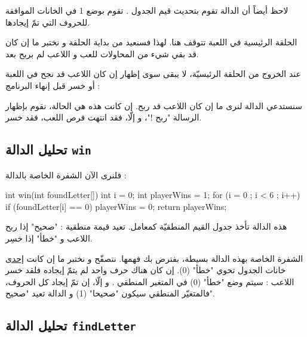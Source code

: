 \begin{information}
لاحظ أيضاً أن الدالة
تقوم بتحديث قيم الجدول
.
تقوم بوضع 1 في الخانات الموافقة للحروف التي تمّ إيجادها.
\end{information}

الحلقة الرئيسية في اللعبة تتوقف هنا. لهذا فسنعيد من بداية الحلقة و نختبر ما إن كان قد بقي شيء من المحاولات للعب و اللاعب لم بربح بعد.

عند الخروج من الحلقة الرئيسيّة، لا يبقى سوى إظهار إن كان اللاعب قد نجح في اللعبة أو خسر قبل إنهاء البرنامج :

\begin{Csource}
if (win(foundLetter))
	printf("\n\nYou win ! the secret word is : %
else
	printf("\n\nYou lose ! the secret word is : %
return 0;
}
\end{Csource}

سنستدعي الدالة
لنرى ما إن كان اللاعب قد ربح. إن كانت هذه هي الحالة، نقوم بإظهار الرسالة "ربح !"، و إلّا، فقد انتهت فرص اللعب، فقد خسر.

\subsection{تحليل الدالة \texttt{win}}

فلنرى الآن الشفرة الخاصة بالدالة
 :

\begin{Csource}
int win(int foundLetter[])
{
  int i = 0;
  int playerWins = 1;
  for (i = 0 ; i < 6 ; i++)
  {
    if (foundLetter[i] == 0)
    	playerWins = 0;
  }
  return playerWins;
}
\end{Csource}

هذه الدالة تأخذ جدول القيم المنطقيّة
كمعامل. تعيد قيمة منطقية : "صحيح" إذا ربح اللاعب و "خطأ" إذا خسِر.

الشفرة الخاصة بهذه الدالة بسيطة، بفترض بك فهمها. نتصفّح
و نختبر ما إن كانت
\underline{إحدى}
خانات الجدول تحوي "خطأ" (0). إن كان هناك حرف واحد لم يتمّ إيجاده فلقد خسر اللاعب : سيتم وضع "خطأ" (0) في المتغير المنطقي
.
و إلّا، إن تمّ إيجاد كل الحروف، فالمتغيّر المنطقي سيكون "صحيحا" (1) و الدالة تعيد "صحيح".

\subsection{تحليل الدالة \texttt{findLetter}}

